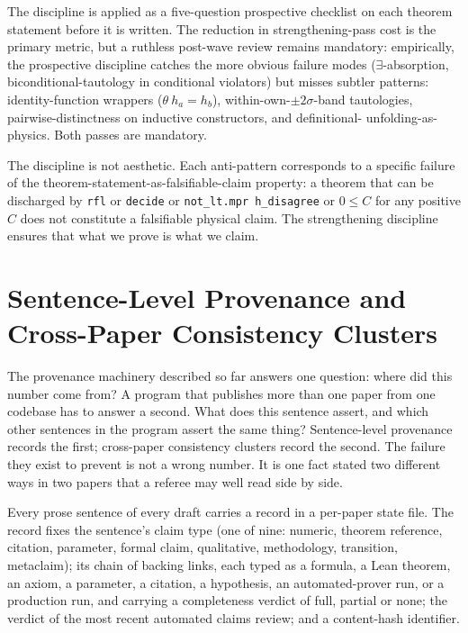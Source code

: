 \documentclass[11pt]{article}
\begin{document}
The discipline is applied as a five-question prospective checklist
on each theorem statement before it is written. The reduction in
strengthening-pass cost is the primary metric, but a ruthless
post-wave review remains mandatory: empirically, the
prospective discipline catches the more obvious failure modes
($\exists$-absorption, biconditional-tautology in conditional
violators) but misses subtler patterns: identity-function wrappers
($\theta\ h_a = h_b$), within-own-$\pm 2\sigma$-band tautologies,
pairwise-distinctness on inductive constructors, and definitional-
unfolding-as-physics. Both passes are mandatory.

The discipline is not aesthetic. Each anti-pattern corresponds to
a specific failure of the theorem-statement-as-falsifiable-claim
property: a theorem that can be discharged by \texttt{rfl} or
\texttt{decide} or \texttt{not\_lt.mpr h\_disagree} or
$0 \leq C$ for any positive $C$ does not constitute a falsifiable
physical claim. The strengthening discipline ensures that what we
prove is what we claim.


\section{Sentence-Level Provenance and Cross-Paper Consistency Clusters}
\label{sec:provenance}

The provenance machinery described so far answers one question:
where did this number come from? A program that publishes more than
one paper from one codebase has to answer a second. What does this
sentence assert, and which other sentences in the program assert the
same thing? Sentence-level provenance records the first; cross-paper
consistency clusters record the second. The failure they exist to
prevent is not a wrong number. It is one fact stated two different
ways in two papers that a referee may well read side by side.

Every prose sentence of every draft carries a record in a per-paper
state file. The record fixes the sentence's claim type (one of nine:
numeric, theorem reference, citation, parameter, formal claim,
qualitative, methodology, transition, metaclaim); its chain of
backing links, each typed as a formula, a Lean theorem, an axiom, a
parameter, a citation, a hypothesis, an automated-prover run, or a
production run, and carrying a completeness verdict of full, partial
or none; the verdict of the most recent automated claims review; and
a content-hash identifier.
\end{document}
